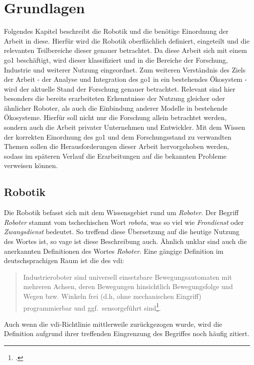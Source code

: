 \section{Grundlagen}
\label{sec:grundlagen}

Folgendes Kapitel beschreibt die Robotik und die benötige Einordnung der Arbeit in diese.
Hierfür wird die Robotik oberflächlich definiert, eingeteilt und die relevanten Teilbereiche dieser genauer betrachtet.
Da diese Arbeit sich mit einem \gls{go1} beschäftigt, wird dieser klassifiziert und in die Bereiche der Forschung, Industrie und weiterer Nutzung eingeordnet.
Zum weiteren Verständnis des Ziels der Arbeit - der Analyse und Integration des \gls{go1} in ein bestehendes Ökosystem -
wird der aktuelle Stand der Forschung genauer betrachtet.
Relevant sind hier besonders die bereits erarbeiteten Erkenntnisse der Nutzung gleicher oder ähnlicher Roboter, als auch
die Einbindung anderer Modelle in bestehende Ökosysteme.
Hierfür soll nicht nur die Forschung allein betrachtet werden, sondern auch die Arbeit privater Unternehmen und Entwickler.
Mit dem Wissen der korrekten Einordnung des \gls{go1} und dem Forschungsstand zu verwandten Themen sollen die Herausforderungen dieser
Arbeit hervorgehoben werden, sodass im späteren Verlauf die Erarbeitungen auf die bekannten Probleme verweisen können.

\subsection{Robotik}
\label{subsec:robotik}

Die Robotik befasst sich mit dem Wissensgebiet rund um \emph{Roboter}.
Der Begriff \emph{Roboter} stammt vom tschechischen Wort \emph{robota}, was so viel wie \emph{Frondienst} oder \emph{Zwangsdienst} bedeutet.
So treffend diese Übersetzung auf die heutige Nutzung des Wortes ist, so vage ist diese Beschreibung auch.
Ähnlich unklar sind auch die anerkannten Definitionen des Wortes \emph{Roboter}.
Eine gängige Definition im deutschsprachigen Raum ist die des \gls{vdi}:

\begin{quote}
    Industrieroboter sind universell einsetzbare Bewegungsautomaten mit mehreren Achsen,
    deren Bewegungen hinsichtlich Bewegungsfolge und Wegen bzw.
    Winkeln frei (d.h, ohne mechanischen Eingriff) programmierbar und ggf.~sensorgeführt sind\footcite{vdi_2860}.
\end{quote}

Auch wenn die \gls{vdi}-Richtlinie mittlerweile zurückgezogen wurde, wird die Definition aufgrund ihrer treffenden Eingrenzung
des Begriffes noch häufig zitiert.

